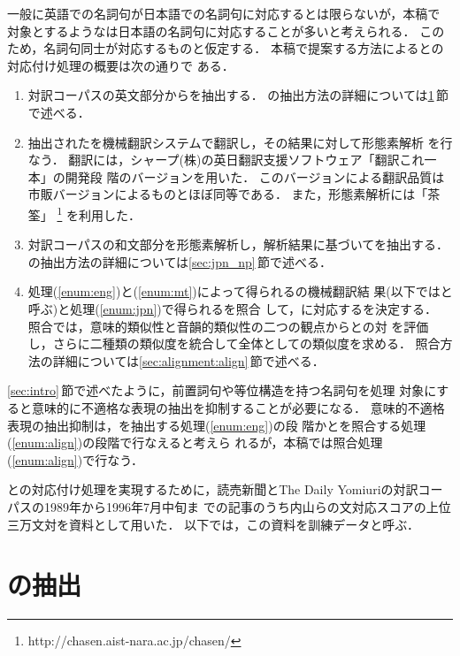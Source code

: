 一般に英語での名詞句が日本語での名詞句に対応するとは限らないが，本稿で
対象とするような{\CPNP}は日本語の名詞句に対応することが多いと考えられる．
このため，名詞句同士が対応するものと仮定する．
本稿で提案する方法による{\CPNP}と{\JNP}の対応付け処理の概要は次の通りで
ある．
\begin{enumerate}
\item \label{enum:eng}
対訳コーパスの英文部分から{\CPNP}を抽出する．
{\CPNP}の抽出方法の詳細については\ref{sec:eng_np}\,節で述べる． 
\item \label{enum:mt}
抽出された{\CPNP}を機械翻訳システムで翻訳し，その結果に対して形態素解析
を行なう．
翻訳には，シャープ(株)の英日翻訳支援ソフトウェア「翻訳これ一本」の開発段
階のバージョンを用いた． 
このバージョンによる翻訳品質は市販バージョンによるものとほぼ同等である．
また，形態素解析には「茶筌」
\footnote{http://chasen.aist-nara.ac.jp/chasen/}
を利用した．
\item \label{enum:jpn}
対訳コーパスの和文部分を形態素解析し，解析結果に基づいて{\JNP}を抽出する．
{\JNP}の抽出方法の詳細については\ref{sec:jpn_np}\,節で述べる． 
\item \label{enum:align}
処理(\ref{enum:eng})と(\ref{enum:mt})によって得られる{\CPNP}の機械翻訳結
果(以下では{\MTNP}と呼ぶ)と処理(\ref{enum:jpn})で得られる{\JNP}を照合
して，{\CPNP}に対応する{\JNP}を決定する．
照合では，意味的類似性と音韻的類似性の二つの観点から{\MTNP}と{\JNP}の対
を評価し，さらに二種類の類似度を統合して全体としての類似度を求める．
照合方法の詳細については\ref{sec:alignment:align}\,節で述べる． 
\end{enumerate}

\ref{sec:intro}\,節で述べたように，前置詞句や等位構造を持つ名詞句を処理
対象にすると意味的に不適格な表現の抽出を抑制することが必要になる．
意味的不適格表現の抽出抑制は，{\CPNP}を抽出する処理(\ref{enum:eng})の段
階か{\MTNP}と{\JNP}を照合する処理(\ref{enum:align})の段階で行なえると考えら
れるが，本稿では照合処理(\ref{enum:align})で行なう．

{\CPNP}と{\JNP}の対応付け処理を実現するために，読売新聞とThe 
Daily Yomiuriの対訳コーパス\cite{Uchiyama03}の1989年から1996年7月中旬ま
での記事のうち内山らの文対応スコアの上位三万文対を資料として用いた．
以下では，この資料を訓練データと呼ぶ．


\section{{\CPNP}の抽出}
\label{sec:eng_np}

